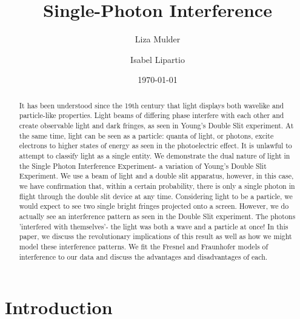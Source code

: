 \documentclass[prb,preprint]{revtex4-1}
\begin{document}

\title{Single-Photon Interference}


\author{Liza Mulder}


\author{Isabel Lipartio}


\date{\today}



\begin{abstract}

It has been understood since the 19th century that light displays both wavelike and particle-like properties.  Light beams of differing phase interfere with each other and create observable light and dark fringes, as seen in Young's Double Slit experiment.  At the same time, light can be seen as a particle:  quanta of light, or photons, excite electrons to higher states of energy as seen in the photoelectric effect.  It is unlawful to attempt to classify light as a single entity.  We demonstrate the dual nature of light in the Single Photon Interference Experiment- a variation of Young's Double Slit Experiment.  We use a beam of light and a double slit apparatus, however, in this case, we have confirmation that, within a certain probability, there is only a single photon in flight through the double slit device at any time.  Considering light to be a particle, we would expect to see two single bright fringes projected onto a screen.  However, we do actually see an interference pattern as seen in the Double Slit experiment.  The photons 'interfered with themselves'- the light was both a wave and a particle at once!  In this paper, we discuss the revolutionary implications of this result as well as how we might model these interference patterns.  We fit the Fresnel and Fraunhofer models of interference to our data and discuss the advantages and disadvantages of each.

\end{abstract}

\maketitle %


\section{Introduction} %
\end{document}
